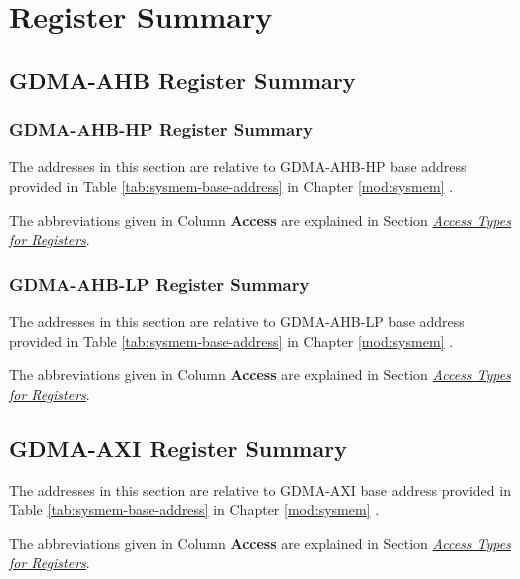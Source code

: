 \documentclass[main\_\_EN.tex]{subfiles}
\begin{document}
\newpage
\begin{landscape}
\hypertarget{dma-reg-summ}{}
\section{Register Summary}
\label{sec:dma-reg-summ}

\subsection{GDMA-AHB Register Summary}
\subsubsection{GDMA-AHB-HP Register Summary}

The addresses in this section are relative to GDMA-AHB-HP base address provided in Table \ref{tab:sysmem-base-address} in Chapter \ref{mod:sysmem} \textit{}.

The abbreviations given in Column \textbf{Access} are explained in Section \hyperref[glossary-access-types]{\textit{Access Types for Registers}}.



\subsubsection{GDMA-AHB-LP Register Summary}

The addresses in this section are relative to GDMA-AHB-LP base address provided in Table \ref{tab:sysmem-base-address} in Chapter \ref{mod:sysmem} \textit{}.

The abbreviations given in Column \textbf{Access} are explained in Section \hyperref[glossary-access-types]{\textit{Access Types for Registers}}.



\subsection{GDMA-AXI Register Summary}

The addresses in this section are relative to GDMA-AXI base address provided in Table \ref{tab:sysmem-base-address} in Chapter \ref{mod:sysmem} \textit{}.

The abbreviations given in Column \textbf{Access} are explained in Section \hyperref[glossary-access-types]{\textit{Access Types for Registers}}.


\end{landscape}
\end{document}

